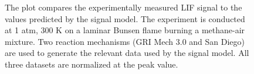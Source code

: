 \begin{figure}[h]

\centering



\caption[Validation of LIF signal model]{The plot compares the experimentally measured LIF signal to the values predicted by the signal model. The experiment is conducted at 1 atm, 300 K on a laminar Bunsen flame burning a methane-air mixture. Two reaction mechanisms (GRI Mech 3.0 and San Diego) are used to generate the relevant data used by the signal model. All three datasets are normalized at the peak value.}

\label{fig:chPLIFSignalExperiment}

\end{figure}

